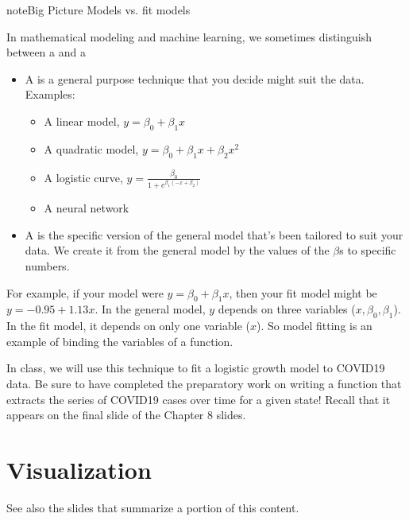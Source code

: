 \documentclass[letterpaper,10pt,english]{sphinxmanual}
\begin{document}
\begin{sphinxadmonition}{note}{Big Picture \sphinxhyphen{} Models vs. fit models}

In mathematical modeling and machine learning, we sometimes distinguish between a  and a 
\begin{itemize}
\item {} 
A  is a general purpose technique that you decide might suit the data.  Examples:
\begin{itemize}
\item {} 
A linear model, \(y=\beta_0+\beta_1x\)

\item {} 
A quadratic model, \(y=\beta_0+\beta_1x+\beta_2x^2\)

\item {} 
A logistic curve, \(y=\frac{\beta_0}{1+e^{\beta_1(-x+\beta_2)}}\)

\item {} 
A neural network

\end{itemize}

\item {} 
A  is the specific version of the general model that’s been tailored to suit your data.  We create it from the general model by  the values of the \(\beta\)s to specific numbers.

\end{itemize}

For example, if your model were \(y=\beta_0+\beta_1x\), then your fit model might be \(y=-0.95+1.13x\).  In the general model, \(y\) depends on three variables (\(x,\beta_0,\beta_1\)).  In the fit model, it depends on only one variable (\(x\)).  So model fitting is an example of binding the variables of a function.
\end{sphinxadmonition}

In class, we will use this technique to fit a logistic growth model to COVID\sphinxhyphen{}19 data.  Be sure to have completed the preparatory work on writing a function that extracts the series of COVID\sphinxhyphen{}19 cases over time for a given state!  Recall that it appears on the final slide of the Chapter 8 slides.


\chapter{Visualization}
\label{\detokenize{chapter-10-visualization:visualization}}\label{\detokenize{chapter-10-visualization::doc}}
See also the slides that summarize a portion of this content.
\end{document}
